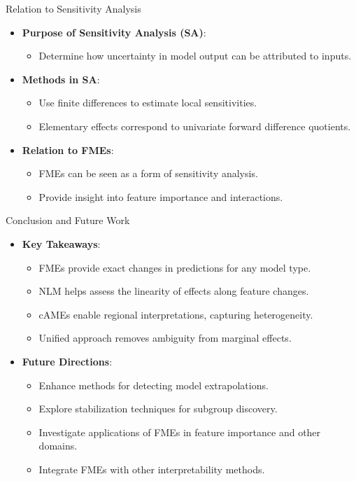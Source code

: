 \documentclass[10pt,compress,t,notes=noshow, xcolor=table]{beamer}
\begin{document}
\begin{frame}{Relation to Sensitivity Analysis}
\begin{itemize}
\item \textbf{Purpose of Sensitivity Analysis (SA)}:
\begin{itemize}
\item Determine how uncertainty in model output can be attributed to inputs.
\end{itemize}
\item \textbf{Methods in SA}:
\begin{itemize}
\item Use finite differences to estimate local sensitivities.
\item Elementary effects correspond to univariate forward difference quotients.
\end{itemize}
\item \textbf{Relation to FMEs}:
\begin{itemize}
\item FMEs can be seen as a form of sensitivity analysis.
\item Provide insight into feature importance and interactions.
\end{itemize}
\end{itemize}
\end{frame}


\begin{frame}{Conclusion and Future Work}
\begin{itemize}
\item \textbf{Key Takeaways}:
\begin{itemize}
  \item FMEs provide exact changes in predictions for any model type.
  \item NLM helps assess the linearity of effects along feature changes.
  \item cAMEs enable regional interpretations, capturing heterogeneity.
  \item Unified approach removes ambiguity from marginal effects.
\end{itemize}
\item \textbf{Future Directions}:
\begin{itemize}
  \item Enhance methods for detecting model extrapolations.
  \item Explore stabilization techniques for subgroup discovery.
  \item Investigate applications of FMEs in feature importance and other domains.
  \item Integrate FMEs with other interpretability methods.
\end{itemize}
\end{itemize}
\end{frame}


% 
% 

\endlecture
\end{document}
